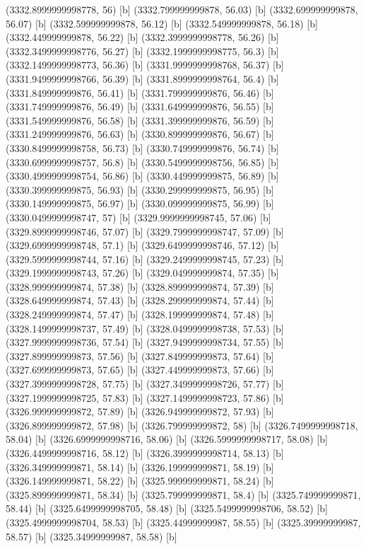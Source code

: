 {{{(3332.8999999998778, 56) [b] 
(3332.799999999878, 56.03) [b] 
(3332.699999999878, 56.07) [b] 
(3332.599999999878, 56.12) [b] 
(3332.549999999878, 56.18) [b] 
(3332.449999999878, 56.22) [b] 
(3332.3999999998778, 56.26) [b] 
(3332.3499999998776, 56.27) [b] 
(3332.1999999998775, 56.3) [b] 
(3332.1499999998773, 56.36) [b] 
(3331.9999999998768, 56.37) [b] 
(3331.9499999998766, 56.39) [b] 
(3331.8999999998764, 56.4) [b] 
(3331.849999999876, 56.41) [b] 
(3331.799999999876, 56.46) [b] 
(3331.749999999876, 56.49) [b] 
(3331.649999999876, 56.55) [b] 
(3331.549999999876, 56.58) [b] 
(3331.399999999876, 56.59) [b] 
(3331.249999999876, 56.63) [b] 
(3330.899999999876, 56.67) [b] 
(3330.8499999998758, 56.73) [b] 
(3330.749999999876, 56.74) [b] 
(3330.6999999998757, 56.8) [b] 
(3330.5499999998756, 56.85) [b] 
(3330.4999999998754, 56.86) [b] 
(3330.449999999875, 56.89) [b] 
(3330.399999999875, 56.93) [b] 
(3330.299999999875, 56.95) [b] 
(3330.149999999875, 56.97) [b] 
(3330.099999999875, 56.99) [b] 
(3330.0499999998747, 57) [b] 
(3329.9999999998745, 57.06) [b] 
(3329.8999999998746, 57.07) [b] 
(3329.7999999998747, 57.09) [b] 
(3329.6999999998748, 57.1) [b] 
(3329.6499999998746, 57.12) [b] 
(3329.5999999998744, 57.16) [b] 
(3329.2499999998745, 57.23) [b] 
(3329.1999999998743, 57.26) [b] 
(3329.049999999874, 57.35) [b] 
(3328.999999999874, 57.38) [b] 
(3328.899999999874, 57.39) [b] 
(3328.649999999874, 57.43) [b] 
(3328.299999999874, 57.44) [b] 
(3328.249999999874, 57.47) [b] 
(3328.199999999874, 57.48) [b] 
(3328.1499999998737, 57.49) [b] 
(3328.0499999998738, 57.53) [b] 
(3327.9999999998736, 57.54) [b] 
(3327.9499999998734, 57.55) [b] 
(3327.899999999873, 57.56) [b] 
(3327.849999999873, 57.64) [b] 
(3327.699999999873, 57.65) [b] 
(3327.449999999873, 57.66) [b] 
(3327.3999999998728, 57.75) [b] 
(3327.3499999998726, 57.77) [b] 
(3327.1999999998725, 57.83) [b] 
(3327.1499999998723, 57.86) [b] 
(3326.999999999872, 57.89) [b] 
(3326.949999999872, 57.93) [b] 
(3326.899999999872, 57.98) [b] 
(3326.799999999872, 58) [b] 
(3326.7499999998718, 58.04) [b] 
(3326.6999999998716, 58.06) [b] 
(3326.5999999998717, 58.08) [b] 
(3326.4499999998716, 58.12) [b] 
(3326.3999999998714, 58.13) [b] 
(3326.349999999871, 58.14) [b] 
(3326.199999999871, 58.19) [b] 
(3326.149999999871, 58.22) [b] 
(3325.999999999871, 58.24) [b] 
(3325.899999999871, 58.34) [b] 
(3325.799999999871, 58.4) [b] 
(3325.749999999871, 58.44) [b] 
(3325.6499999998705, 58.48) [b] 
(3325.5499999998706, 58.52) [b] 
(3325.4999999998704, 58.53) [b] 
(3325.44999999987, 58.55) [b] 
(3325.39999999987, 58.57) [b] 
(3325.34999999987, 58.58) [b] 
}}}
